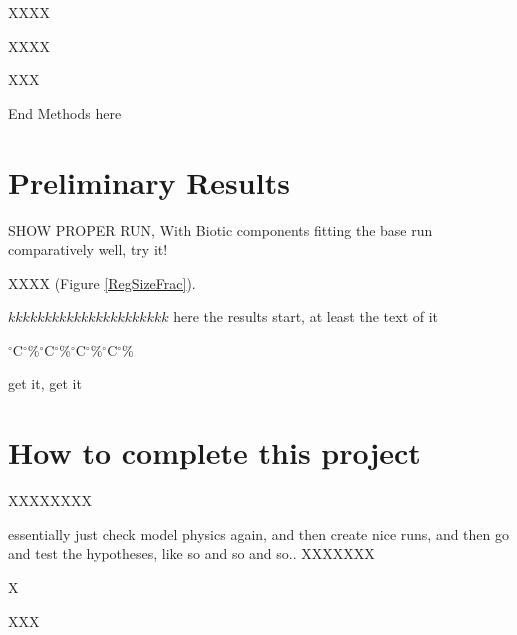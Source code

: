 XXXX

XXXX

XXX


End Methods here

\section{Preliminary Results}


SHOW PROPER RUN, With Biotic components fitting the base run comparatively well, try it!

XXXX (Figure \ref{RegSizeFrac}).



$kkkkkkkkkkkkkkkkkkkkkk$ here the results start, at least the text of it

$^{\circ}$C$^{\circ}$\%$^{\circ}$C$^{\circ}$\%$^{\circ}$C$^{\circ}$\%$^{\circ}$C$^{\circ}$\%


get it, get it


\section{How to complete this project}
XXXXXXXX

essentially just check model physics again, and then
create nice runs, and then go and test the hypotheses, like so and so and so..
XXXXXXX

X

XXX


